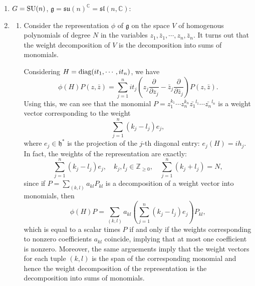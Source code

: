 \documentclass{report}
\begin{document}
\begin{example}\cite[Paragraph 5.1]{knapp1996lie}
\begin{enumerate}[label = (\roman*)]
    \item $G = \operatorname{{\mathrm{SU}}}(n)$, $\mathfrak g = \mathfrak{su}(n)^\mathbb C = \mathfrak{sl}(n, \mathbb C)$:
    \item \begin{enumerate}[label = (\alph*)]
        \item Consider the representation $\phi$ of $\mathfrak g$ on the space $V$ of homogenous polynomials of degree $N$ in the variables $z_1, \bar z_1, \cdots, z_n, \bar z_n$.
        It turns out that the weight decomposition of $V$ is the decomposition into sums of monomials.
    
        Considering $H = \operatorname{diag}(i t_1, \cdots, it_n )$, we have
        \[
        \phi(H)P(z,\bar z) = \sum_{j=1}^n i t_j \left( z_j \frac{\partial}{\partial z_j} - \bar z_j \frac{\partial}{\partial \bar z_j} \right) P(z, \bar z).
        \]
        Using this, we can see that the monomial $P = z_1^{k_1} \cdots z_n^{k_n} \bar{z_1}^{l_1} \cdots \bar{z_n}^{l_n} $ is a weight vector corresponding to the weight
        \[
        \sum_{j=1}^n (k_j - l_j) e_j,
        \]
        where $e_j \in \mathfrak h^*$ is the projection of the $j$-th diagonal entry: $e_j(H) = ih_j$.
        In fact, the weights of the representation are exactly:
        \[
        \sum_{j=1}^n (k_j - l_j) e_j, \quad k_j, l_j \in \mathbb Z_{\geq 0}, \quad \sum_{j=1}^n (k_j + l_j) = N,
        \]
        since if $P = \sum_{(k,l)} a_{kl} P_{kl}$ is a decomposition of a weight vector into monomials, then
        \[
        \phi(H)P = \sum_{(k,l)} a_{kl} \left( \sum_{j=1}^n (k_j - l_j) e_j \right) P_{kl},
        \]
        which is equal to a scalar times $P$ if and only if the weights corresponding to nonzero coefficients $a_{kl}$ coincide, implying that at most one coefficient is nonzero.
        Moreover, the same arguements imply that the weight vectors for each tuple $(k,l)$ is the span of the corresponding monomial and hence the weight decomposition of the representation is the decomposition into sums of monomials.
    

\end{enumerate}
\end{enumerate}
\end{example}
\end{document}
